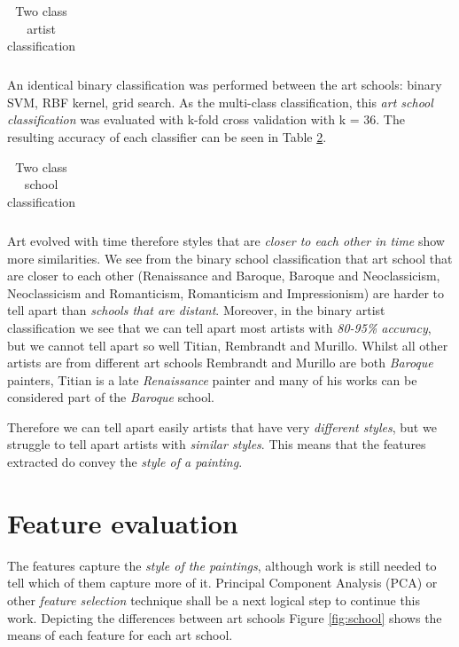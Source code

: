 \documentclass[11pt,a4paper,twoside,openright]{report}
\begin{document}
\begin{table}[ptb]
\centering
\begin{tabular}{r||r|r|r|r|r}
\toprule

\bottomrule
\end{tabular}
\caption[Two class artist classification]{Two class artist classification}
\label{tab:foldart}
\end{table}

An identical binary classification was performed between the art schools:
binary SVM, RBF kernel, grid search.  As the multi-class classification, this
\emph{art school classification} was evaluated with k-fold cross validation
with k = 36.  The resulting accuracy of each classifier can be seen in Table
\ref{tab:foldsch}.

\begin{table}[ptb]
\centering
\begin{tabular}{r||r|r|r|r|r}
\toprule

\bottomrule
\end{tabular}
\caption[Two class school classification]{Two class school classification}
\label{tab:foldsch}
\end{table}

Art evolved with time therefore styles that are \emph{closer to each other in
time} show more similarities.  We see from the binary school classification
that art school that are closer to each other (Renaissance and Baroque, Baroque
and Neoclassicism, Neoclassicism and Romanticism, Romanticism and
Impressionism) are harder to tell apart than \emph{schools that are distant}.
Moreover, in the binary artist classification we see that we can tell apart
most artists with \emph{80-95\% accuracy}, but we cannot tell apart so well
Titian, Rembrandt and Murillo.  Whilst all other artists are from different art
schools Rembrandt and Murillo are both \emph{Baroque} painters, Titian is a
late \emph{Renaissance} painter and many of his works can be considered part of
the \emph{Baroque} school.

Therefore we can tell apart easily artists that have very \emph{different
styles}, but we struggle to tell apart artists with \emph{similar styles}.
This means that the features extracted do convey the \emph{style of a
painting}.

\section{Feature evaluation}

The features capture the \emph{style of the paintings}, although work is still
needed to tell which of them capture more of it.  Principal Component Analysis
(PCA) or other \emph{feature selection} technique shall be a next logical step
to continue this work.  Depicting the differences between art schools Figure
\ref{fig:school} shows the means of each feature for each art school.
\end{document}
